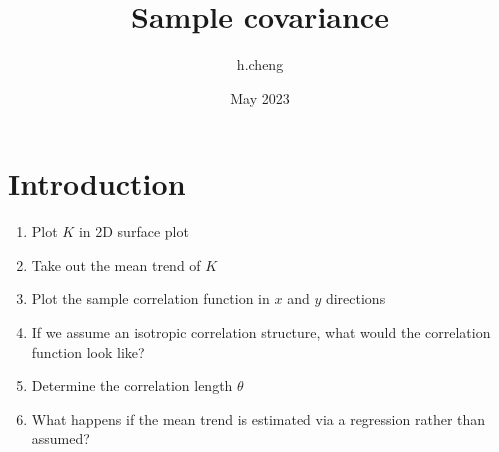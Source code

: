 \documentclass{article}
\title{Sample covariance}
\author{h.cheng }
\date{May 2023}
\begin{document}
\maketitle

\section{Introduction}

\begin{enumerate}
    \item Plot $ K $ in 2D surface plot
    \item Take out the mean trend of $ K $
    \item Plot the sample correlation function in $ x $ and $ y $ directions
    \item If we assume an isotropic correlation structure, what would the correlation function look like?
    \item Determine the correlation length $\theta$
    \item What happens if the mean trend is estimated via a regression rather than assumed?
\end{enumerate}
\end{document}
